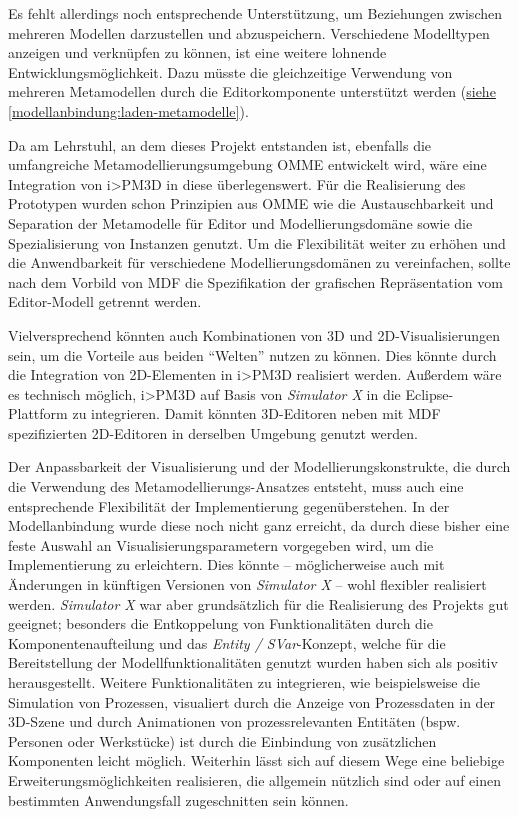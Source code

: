 \documentclass[a4paper,10pt]{sphinxmanual}
\begin{document}
Es fehlt allerdings noch entsprechende Unterstützung, um Beziehungen zwischen mehreren Modellen darzustellen und abzuspeichern.
Verschiedene Modelltypen anzeigen und verknüpfen zu können, ist eine weitere lohnende Entwicklungsmöglichkeit.
Dazu müsste die gleichzeitige Verwendung von mehreren Metamodellen durch die Editorkomponente unterstützt werden ({\hyperref[modellanbindung:laden-metamodelle]{siehe}} \autoref*{modellanbindung:laden-metamodelle}).

Da am Lehrstuhl, an dem dieses Projekt entstanden ist, ebenfalls die umfangreiche Metamodellierungsumgebung OMME entwickelt wird, wäre eine Integration von i\textgreater{}PM3D in diese überlegenswert.
Für die Realisierung des Prototypen wurden schon Prinzipien aus OMME wie die Austauschbarkeit und Separation der Metamodelle für Editor und Modellierungsdomäne sowie die Spezialisierung von Instanzen genutzt.
Um die Flexibilität weiter zu erhöhen und die Anwendbarkeit für verschiedene Modellierungsdomänen zu vereinfachen, sollte nach dem Vorbild von MDF die Spezifikation der grafischen Repräsentation vom Editor-Modell getrennt werden.

Vielversprechend könnten auch Kombinationen von 3D und 2D-Visualisierungen sein, um die Vorteile aus beiden "`Welten"' nutzen zu können.
Dies könnte durch die Integration von 2D-Elementen in i\textgreater{}PM3D realisiert werden.
Außerdem wäre es technisch möglich, i\textgreater{}PM3D auf Basis von \emph{Simulator X} in die Eclipse-Plattform zu integrieren.
Damit könnten 3D-Editoren neben mit MDF spezifizierten 2D-Editoren in derselben Umgebung genutzt werden.

Der Anpassbarkeit der Visualisierung und der Modellierungskonstrukte, die durch die Verwendung des Metamodellierungs-Ansatzes entsteht, muss auch eine entsprechende Flexibilität der Implementierung gegenüberstehen.
In der Modellanbindung wurde diese noch nicht ganz erreicht, da durch diese bisher eine feste Auswahl an Visualisierungsparametern vorgegeben wird, um die Implementierung zu erleichtern.
Dies könnte – möglicherweise auch mit Änderungen in künftigen Versionen von \emph{Simulator X} – wohl flexibler realisiert werden.
\emph{Simulator X} war aber grundsätzlich für die Realisierung des Projekts gut geeignet; besonders die Entkoppelung von Funktionalitäten durch die Komponentenaufteilung und das \emph{Entity / SVar}-Konzept, welche für die Bereitstellung der Modellfunktionalitäten genutzt wurden haben sich als positiv herausgestellt.
Weitere Funktionalitäten zu integrieren, wie beispielsweise die Simulation von Prozessen, visualiert durch die Anzeige von Prozessdaten in der 3D-Szene und durch Animationen von prozessrelevanten Entitäten (bspw. Personen oder Werkstücke) ist durch die Einbindung von zusätzlichen Komponenten leicht möglich. Weiterhin lässt sich auf diesem Wege eine beliebige Erweiterungsmöglichkeiten realisieren, die allgemein nützlich sind oder auf einen bestimmten Anwendungsfall zugeschnitten sein können.
\end{document}
